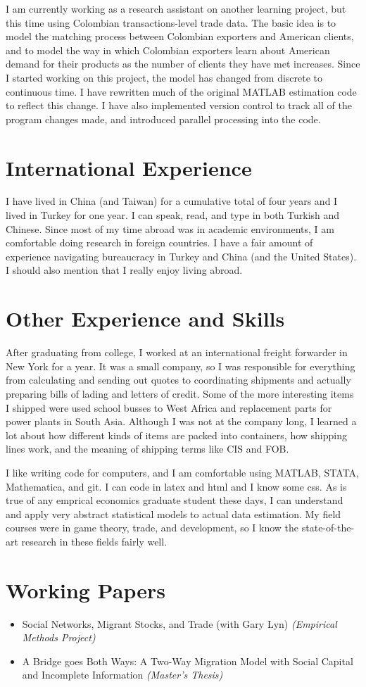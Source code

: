 \documentclass[a4paper,10pt]{article}
\begin{document}
I am currently working as a research assistant on another learning project, but this time using Colombian transactions-level trade data.  The basic idea is to model the matching process between Colombian exporters and American clients, and to model the way in which Colombian exporters learn about American demand for their products as the number of clients they have met increases.  Since I started working on this project, the model has changed from discrete to continuous time.  I have rewritten much of the original MATLAB estimation code to reflect this change.  I have also implemented version control to track all of the program changes made, and introduced parallel processing into the code.

\section{International Experience}
I have lived in China (and Taiwan) for a cumulative total of four years and I lived in Turkey for one year.  I can speak, read, and type in both Turkish and Chinese.  Since most of my time abroad was in academic environments, I am comfortable doing research in foreign countries.  I have a fair amount of experience navigating bureaucracy in Turkey and China (and the United States).  I should also mention that I really enjoy living abroad.

\section{Other Experience and Skills}
After graduating from college, I worked at an international freight forwarder in New York for a year.  It was a small company, so I was responsible for everything from calculating and sending out quotes to coordinating shipments and actually preparing bills of lading and letters of credit.  Some of the more interesting items I shipped were used school busses to West Africa and replacement parts for power plants in South Asia.  Although I was not at the company long, I learned a lot about how different kinds of items are packed into containers, how shipping lines work, and the meaning of shipping terms like CIS and FOB.

I like writing code for computers, and I am comfortable using MATLAB, STATA, Mathematica, and git.  I can code in latex and html and I know some css.  As is true of any emprical economics graduate student these days, I can understand and apply very abstract statistical models to actual data estimation.  My field courses were in game theory, trade, and development, so I know the state-of-the-art research in these fields fairly well.

\section{Working Papers}
\begin{itemize}
 \item Social Networks, Migrant Stocks, and Trade (with Gary Lyn) \emph{(Empirical Methods Project)}
 \item A Bridge goes Both Ways: A Two-Way Migration Model with Social Capital and Incomplete Information \emph{(Master's Thesis)}
\end{itemize}
\end{document}
